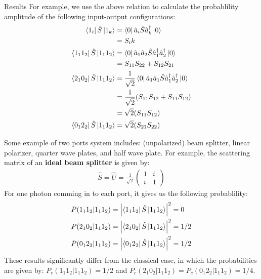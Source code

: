 \documentclass[%
 aps,
 reprint,
 twocolumn,
 amsmath,amssymb,
floatfix,
]{revtex4-2}
\begin{document}
\begin{section}{Results}
For example, we use the above relation to calculate the probablility amplitude of the following input-output configurations:
\begin{align*}
	\bra{1_i} \hat{S} \ket{1_k}         & = \bra{0} \hat{a}_i \hat{S} \hat{a}_k^\dagger \ket{0}                                                \\
	                                    & = S_ik                                                                                               \\
	\bra{1_1 1_2} \hat{S} \ket{1_1 1_2} & = \bra{0} \hat{a}_1 \hat{a}_2 \hat{S} \hat{a}_1^\dagger \hat{a}_2^\dagger \ket{0}                    \\
	                                    & = S_{11}S_{22} + S_{12}S_{21}                                                                        \\
	\bra{2_1 0_2} \hat{S} \ket{1_1 1_2} & = \frac{1}{\sqrt{2}} \bra{0} \hat{a}_1 \hat{a}_1 \hat{S} \hat{a}_1^\dagger \hat{a}_2^\dagger \ket{0} \\
	                                    & = \frac{1}{\sqrt{2}} (S_{11} S_{12} + S_{11} S_{12})                                                 \\
	                                    & = \sqrt{2} (S_{11} S_{12})                                                                           \\
	\bra{0_1 2_2} \hat{S} \ket{1_1 1_2} & = \sqrt{2} (S_{21} S_{22})
\end{align*}

Some example of two ports system includes: (unpolarized) beam splitter, linear polarizer, quarter wave plates, and half wave plate. For example, the scattering matrix of an {\bf ideal beam splitter} is given by:
\begin{align*}
	\hat{S} = \hat{U} = \frac{1}{\sqrt{2}} \begin{pmatrix}
		                                       1 & i \\
		                                       i & 1
	                                       \end{pmatrix}
\end{align*}
For one photon comming in to each port, it gives us the following probablility:
\begin{align*}
	P(1_1 1_2 | 1_1 1_2) = \left| \bra{1_1 1_2} \hat{S} \ket{1_1 1_2} \right|^2 & = 0   \\
	P(2_1 0_2 | 1_1 1_2) = \left| \bra{2_1 0_2} \hat{S} \ket{1_1 1_2} \right|^2 & = 1/2 \\
	P(0_1 2_2 | 1_1 1_2) = \left| \bra{0_1 2_2} \hat{S} \ket{1_1 1_2} \right|^2 & = 1/2
\end{align*}
These results significantly differ from the classical case, in which the probabilities are given by: $P_c(1_1 1_2 | 1_1 1_2) = 1/2$ and $P_c(2_1 0_2 | 1_1 1_2) = P_c(0_1 2_2 | 1_1 1_2) = 1/4$.


\end{section}
\end{document}

